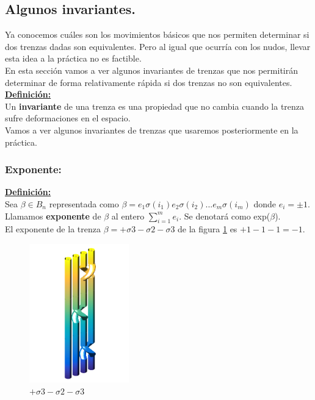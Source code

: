 \documentclass[14pt]{extarticle}
\begin{document}
\subsection{Algunos invariantes.}
Ya conocemos cuáles son los movimientos básicos que nos permiten determinar si dos trenzas dadas son equivalentes. Pero al igual que ocurría con los nudos, llevar esta idea a la práctica no es factible.\\

En esta sección vamos a ver algunos invariantes de trenzas que nos permitirán determinar de forma relativamente rápida si dos trenzas no son equivalentes.\\

\underline{\textbf{Definición:}} \\
Un \textbf{invariante} de una trenza es una propiedad que no cambia cuando la trenza sufre deformaciones en el espacio. \\

Vamos a ver algunos invariantes de trenzas que usaremos posteriormente en la práctica.

\bigskip
\subsubsection{Exponente:}\label{invtren1}
\textbf{\underline{Definición:}}\\
Sea $\beta \in B_{n}$ representada como $\beta = e_{1} \sigma(i_{1}) e_{2} \sigma(i_{2}) ... e_{m} \sigma(i_{m}) $ donde $e_{i} = \pm 1$.\\
Llamamos \textbf{exponente} de $\beta$ al entero $ \sum_{i=1}^{m} e_{i} $. Se denotará como exp($\beta$).\\

El exponente de la trenza $\beta = +\sigma3-\sigma2-\sigma3$ de la figura \ref{exp1} es $+1-1-1=-1$.\\
   \begin{figure}[h!]
   	\centering
   	\includegraphics[width=4.3cm]{itrenzas/4c3.png}
   	\caption{$+\sigma3-\sigma2-\sigma3$}
   	\label{exp1} 
   \end{figure}
\end{document}
